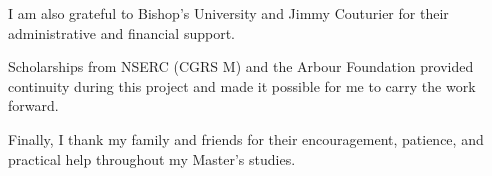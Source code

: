 \documentclass[11pt]{buthesis}
\numberwithin{equation}{chapter}
\begin{document}
I am also grateful to Bishop's University and Jimmy Couturier for their
administrative and financial support.

Scholarships from NSERC (CGRS M) and the Arbour Foundation provided continuity
during this project and made it possible for me to carry the work forward.

Finally, I thank my family and friends for their encouragement, patience, and
practical help throughout my Master's studies.

\afterpreface








\appendix




\end{document}
